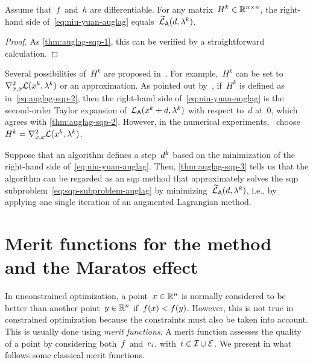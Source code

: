 \begin{theorem}
    \label{thm:auglag-sqp-3}
    Assume that~$f$ and~$h$ are differentiable.
    For any matrix~$H^k \in \mathbb{R}^{n \times n}$, the right-hand side of~\cref{eq:niu-yuan-auglag} equals~$\auglagalt(\step, \lm[k])$.
\end{theorem}

\begin{proof}
    As \cref{thm:auglag-sqp-1}, this can be verified by a straightforward calculation.
\end{proof}

Several possibilities of~$H^k$ are proposed in~\cite{Niu_Yuan_2010,Wang_Yuan_2014}.
For example,~$H^k$ can be set to~$\nabla_{x, x}^2 \lag(\iter[k], \lm[k])$ or an approximation.
As pointed out by~\cite[\S~2.1]{Niu_Yuan_2010}, if~$H^k$ is defined as in~\cref{eq:auglag-sqp-2}, then the right-hand side of~\cref{eq:niu-yuan-auglag} is the second-order Taylor expansion of~$\auglag(\iter[k] + d, \lm[k])$ with respect to~$d$ at~$0$, which agrees with \cref{thm:auglag-sqp-2}.
However, in the numerical experiments,~\cite{Niu_Yuan_2010,Wang_Yuan_2014} choose~$H^k = \nabla_{x, x}^2 \lag(\iter[k], \lm[k])$.

Suppose that an algorithm defines a step~$\step[k]$ based on the minimization of the right-hand side of~\cref{eq:niu-yuan-auglag}.
Then, \cref{thm:auglag-sqp-3} tells us that the algorithm can be regarded as an \gls{sqp} method that approximately solves the \gls{sqp} subproblem~\cref{eq:sqp-subproblem-auglag} by minimizing~$\auglagalt(\step, \lm[k])$, i.e., by applying one single iteration of an augmented Lagrangian method.

\section{Merit functions for the  method and the Maratos effect}
\label{sec:sqp-merit-functions}

In unconstrained optimization, a point~$x \in \mathbb{R}^n$ is normally considered to be better than another point~$y \in \mathbb{R}^n$ if~$f(x) < f(y)$.
However, this is not true in constrained optimization because the constraints must also be taken into account.
This is usually done using \emph{merit functions}.
A merit function assesses the quality of a point by considering both~$f$ and~$c_{i}$, with~$i \in \mathcal{I} \cup \mathcal{E}$.
We present in what follows some classical merit functions.

